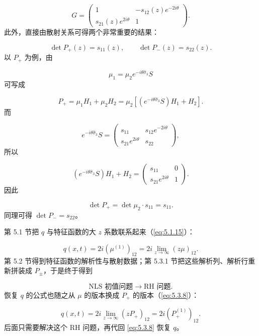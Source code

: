\documentclass[
    lang=cn,
    scheme=chinese,
    mode=simple,
    device=normal,
    color=blue,
    math=cm,
    thmcnt=section,
    12pt,
    nowatermark
]{elegantbook}
\begin{document}
\begin{callout}
    \[
        G=
        \begin{pmatrix}
            1                     & -s_{12}(z)e^{-2i\theta} \\
            s_{21}(z)e^{2i\theta} & 1
        \end{pmatrix}.
    \]
    此外，直接由散射关系可得两个非常重要的结果：

    \[
        \det P_+(z)=s_{11}(z),
        \qquad
        \det P_-(z)=s_{22}(z).
    \]
    以 $P_+$ 为例，由

    \[
        \mu_1
        =
        \mu_2e^{-i\theta\widehat{\sigma}_3}S
    \]
    可写成

    \[
        P_+
        =
        \mu_1H_1+\mu_2H_2
        =
        \mu_2
        \left[
            \left(e^{-i\theta\widehat{\sigma}_3}S\right)H_1+H_2
            \right].
    \]
    而

    \[
        e^{-i\theta\widehat{\sigma}_3}S
        =
        \begin{pmatrix}
            s_{11}             & s_{12}e^{-2i\theta} \\
            s_{21}e^{2i\theta} & s_{22}
        \end{pmatrix},
    \]
    所以

    \[
        \left(e^{-i\theta\widehat{\sigma}_3}S\right)H_1+H_2
        =
        \begin{pmatrix}
            s_{11}             & 0 \\
            s_{21}e^{2i\theta} & 1
        \end{pmatrix}.
    \]
    因此

    \[
        \det P_+
        =
        \det\mu_2\cdot s_{11}
        =
        s_{11}.
    \]
    同理可得 $\det P_-=s_{22}$。
\end{callout}

\begin{callout}[到这里发生了什么？]
    第 5.1 节把 $q$ 与特征函数的大 $z$ 系数联系起来（\eqref{eq:5.1.15}）：

    \[
        q(x,t)=2i(\mu^{(1)})_{12}=2i\lim\limits_{z\to\infty}(z\mu)_{12}.
    \]
    第 5.2 节得到特征函数的解析性与散射数据；第 5.3.1 节把这些解析列、解析行重新拼装成 $P_\pm$，于是终于得到

    \[
        \boxed{\text{NLS 初值问题}\longrightarrow\text{RH 问题}.}
    \]
    恢复 $q$ 的公式也随之从 $\mu$ 的版本换成 $P_+$ 的版本（\eqref{eq:5.3.8}）：

    \[
        q(x,t)=2i\lim\limits_{z\to\infty}(zP_+)_{12}=2i(P_+^{(1)})_{12}.
    \]
    后面只需要解决这个 RH 问题，再代回 \eqref{eq:5.3.8} 恢复 $q$。
\end{callout}
\end{document}
